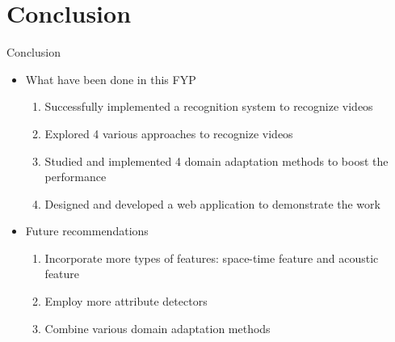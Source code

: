\section{Conclusion}
\begin{frame}{Conclusion}

	\begin{itemize}
		\item What have been done in this FYP
			\begin{enumerate}
				\item Successfully implemented a recognition system to recognize videos
				\item Explored 4 various approaches to recognize videos
				\item Studied and implemented 4 domain adaptation methods to boost the performance
				\item Designed and developed a web application to demonstrate the work
			\end{enumerate}

		\item Future recommendations
			\begin{enumerate}
				\item Incorporate more types of features: space-time feature and acoustic feature
				\item Employ more attribute detectors 
				\item Combine various domain adaptation methods
			\end{enumerate}
	\end{itemize}
\end{frame}